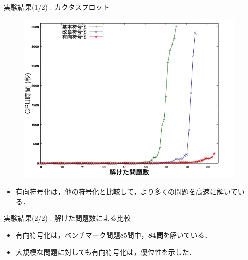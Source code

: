 \documentclass[dvipdfmx,11pt]{beamer}
\begin{document}
\begin{frame}{実験結果(1/2) : カクタスプロット}
 \begin{figure}[h]
  \centering
  \includegraphics[scale=0.4]{fig/cactus.png}
 \end{figure}

\begin{itemize}
 \item 有向符号化は，他の符号化と比較して，より多くの問題を高速に解いている．
\end{itemize}\vfill
\end{frame}
\begin{frame}{実験結果(2/2) : 解けた問題数による比較}
 
\begin{table}[t]
 \centering
 
\end{table}\vfill

\begin{itemize}
 \item 有向符号化は，ベンチマーク問題85問中，\textbf{84問}を解いている．
 \item 大規模な問題に対しても有向符号化は，優位性を示した．
\end{itemize}\vfill
\end{frame}
\end{document}
